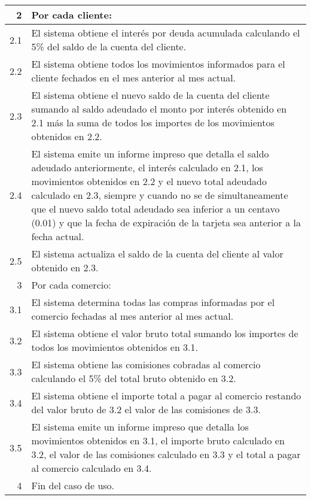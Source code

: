 \begin{tabularx}{\textwidth}{| r | X |}
\hline
2 & Por cada cliente: \\
\hline
2.1 & El sistema obtiene el interés por deuda acumulada calculando el 5\% del
saldo de la cuenta del cliente. \\
\hline
2.2 & El sistema obtiene todos los movimientos informados para el cliente
fechados en el mes anterior al mes actual. \\
\hline
2.3 & El sistema obtiene el nuevo saldo de la cuenta del cliente sumando al
saldo adeudado el monto por interés obtenido en 2.1 más la suma de todos los
importes de los movimientos obtenidos en 2.2. \\
\hline
2.4 & El sistema emite un informe impreso que detalla el saldo adeudado
anteriormente, el interés calculado en 2.1, los movimientos obtenidos en 2.2 y
el nuevo total adeudado calculado en 2.3, siempre y cuando no se de
simultaneamente que el nuevo saldo total adeudado sea inferior a un centavo
(0.01) y que la fecha de expiración de la tarjeta sea anterior a la fecha
actual.\\
\hline
2.5 & El sistema actualiza el saldo de la cuenta del cliente al valor obtenido en 2.3. \\
\hline
3 & Por cada comercio: \\
\hline
3.1 & El sistema determina todas las compras informadas por el comercio
fechadas al mes anterior al mes actual. \\
\hline
3.2 & El sistema obtiene el valor bruto total sumando los importes de todos los
movimientos obtenidos en 3.1. \\
\hline
3.3 & El sistema obtiene las comisiones cobradas al comercio calculando el 5\%
del total bruto obtenido en 3.2. \\
\hline
3.4 & El sistema obtiene el importe total a pagar al comercio restando del
valor bruto de 3.2 el valor de las comisiones de 3.3. \\
\hline
3.5 & El sistema emite un informe impreso que detalla los movimientos obtenidos
en 3.1, el importe bruto calculado en 3.2, el valor de las comisiones calculado
en 3.3 y el total a pagar al comercio calculado en 3.4. \\
\hline
4 & Fin del caso de uso. \\

\hline
\end{tabularx}

